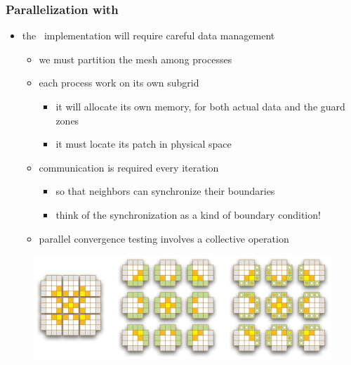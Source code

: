 \begin{frame}[fragile]
%
  \frametitle{Parallelization with \mpi}
%
  \begin{itemize}
%
  \item the \mpi\ implementation will require careful data management
    \begin{itemize}
    \item we must partition the mesh among processes
    \item each process work on its own subgrid
      \begin{itemize}
      \item it will allocate its own memory, for both actual data and the guard zones
      \item it must locate its patch in physical space
      \end{itemize}
    \item communication is required every iteration
      \begin{itemize}
      \item so that neighbors can synchronize their boundaries
      \item think of the synchronization as a kind of boundary condition!
      \end{itemize}
    \item parallel convergence testing involves a collective operation
    \end{itemize}
%
  \end{itemize}
%
  \begin{figure}
    \includegraphics[scale=0.5]{figures/structured-partitioning.pdf}
  \end{figure} 
% 
\end{frame}

